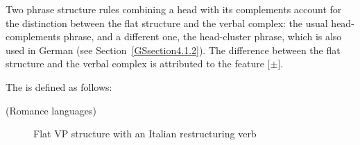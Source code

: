 {Two phrase structure rules combining a head with its complements account for the distinction between the flat structure and the verbal complex: the usual head-complements phrase, and a different one, the head-cluster phrase, which is also used in German (see Section~\ref{GSsection4.1.2}). The difference between the flat structure and the verbal complex is attributed to the feature [\light $\pm$]. 

The  is defined as follows:

\ea
\label{GSexemple25}
 (Romance languages) \impl \\	
\z



\begin{figure}
\caption{Flat VP structure with an Italian restructuring verb}
    \label{GSfigure4}
\end{figure}

}
